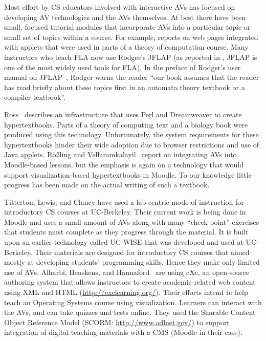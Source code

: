 \documentclass[11pt]{article}
\begin{document}
Most effort by CS educators involved with interactive AVs has focused
on developing AV technologies and the AVs themselves.
At best there have been small, focused tutorial modules that
incorporate AVs into a particular topic or small set of topics
within a course.
For example, \cite{Ross02Theory} reports on
web pages integrated with applets that were used in parts of a theory
of computation course.
Many instructors who teach FLA now use Rodger's JFLAP
(as reported in \cite{CSK11}, JFLAP is one of the most widely used
tools for FLA).
In the preface of Rodger's user manual on JFLAP~\cite{RoF06}, 
Rodger warns the reader ``our book assumes
that the reader has read briefly about these topics first in an
automata theory textbook or a compiler textbook''.

Ross~\cite{Ross08} describes an infrastructure that uses Perl and
Dreamweaver to create hypertextbooks.
Parts of a theory of computing text
and a biology book were produced using this technology.
Unfortunately, the system requirements for these hypertextbooks
hinder their wide adoption due to browser restrictions and use of Java
applets.
R{\"o}{\ss}ling and Vellaramkalayil~\cite{Roessling:Moodle} report on
integrating AVs into Moodle-based lessons,
but the emphasis is again on a technology that would support
visualization-based hypertextbooks in Moodle.
To our knowledge little progress has been made on the
actual writing of such a textbook.

Titterton, Lewis, and Clancy \cite{titterton2010experiences} have
used a lab-centric mode of instruction for introductory CS courses at
UC-Berkeley.
Their current work is being done in Moodle and uses a
small amount of AVs along with many ``check point'' exercises
that students must complete as they progress through the material.
It is built upon an earlier technology called UC-WISE that was
developed and used at UC-Berkeley.
Their materials are designed for introductory CS courses that aimed
mostly at developing students' programming skills.
Hence they make only limited use of AVs.
Alharbi, Henskens, and Hannaford~\cite{Alharbi2010} are using eXe,
an open-source authoring system that allows instructors to create
academic-related web content using XML and HTML
(\url{http://exelearning.org/}).
Their efforts intend to help teach an Operating Systems course using
visualization.
Learners can interact with the AVs, and can take quizzes and tests
online.
They used the Sharable Content Object Reference Model
(SCORM: \url{http://www.adlnet.gov/}) to support integration of
digital teaching materials with a CMS (Moodle in their case).
\end{document}
